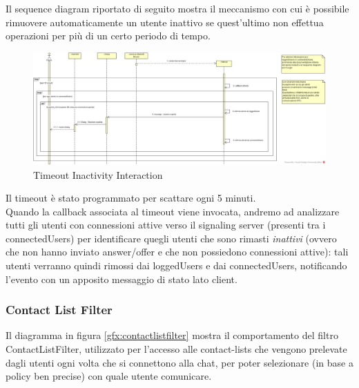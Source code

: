 Il sequence diagram riportato di seguito mostra il meccanismo con cui è possibile rimuovere automaticamente un utente inattivo se quest'ultimo non effettua operazioni per più di un certo periodo di tempo.

\begin{figure}[!htpb]
	\centering
	\includegraphics[scale = .35]{img/sequence_timeout.png}
	\caption{Timeout Inactivity Interaction}
	\label{gfx:timeoutinteraction}
\end{figure}

Il timeout è stato programmato per scattare ogni 5 minuti.\\
Quando la callback associata al timeout viene invocata, andremo ad analizzare tutti gli utenti con connessioni attive verso il signaling server (presenti tra i connectedUsers) per identificare quegli utenti che sono rimasti \textit{inattivi} (ovvero che non hanno inviato answer/offer e che non possiedono connessioni attive): tali utenti verranno quindi rimossi dai loggedUsers e dai connectedUsers, notificando l'evento con un apposito messaggio di stato lato client.\\

\subsubsection{Contact List Filter}

Il diagramma in figura \ref{gfx:contactlistfilter} mostra il comportamento del filtro ContactListFilter, utilizzato per l'accesso alle contact-lists che vengono prelevate dagli utenti ogni volta che si connettono alla chat, per poter selezionare (in base a policy ben precise) con quale utente comunicare.

